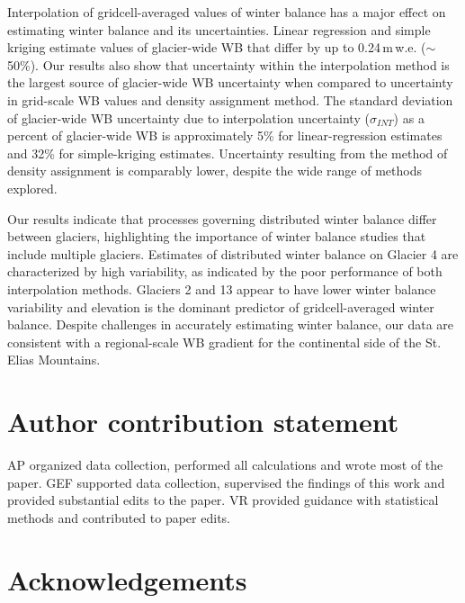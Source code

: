 \documentclass[twocolumn, letterpaper]{igs}
\begin{document}
Interpolation of gridcell-averaged values of winter balance has a major effect on estimating winter balance and its uncertainties. Linear regression and simple kriging estimate values of glacier-wide WB that differ by up to 0.24\,m\,w.e. ($\sim$50\%). Our results also show that uncertainty within the interpolation method is the largest source of glacier-wide WB uncertainty when compared to uncertainty in grid-scale WB values and density assignment method. The standard deviation of glacier-wide WB uncertainty due to interpolation uncertainty ($\sigma_{INT}$) as a percent of glacier-wide WB is approximately 5\% for linear-regression estimates and 32\% for simple-kriging estimates. Uncertainty resulting from the method of density assignment is comparably lower, despite the wide range of methods explored. 

Our results indicate that processes governing distributed winter balance differ between glaciers, highlighting the importance of winter balance studies that include multiple glaciers. Estimates of distributed winter balance on Glacier 4 are characterized by high variability, as indicated by the poor performance of both interpolation methods. Glaciers 2 and 13 appear to have lower winter balance variability and elevation is the dominant predictor of gridcell-averaged winter balance. Despite challenges in accurately estimating winter balance, our data are consistent with a regional-scale WB gradient for the continental side of the St. Elias Mountains. 

\section{Author contribution statement}

AP organized data collection, performed all calculations and wrote most of the paper. GEF supported data collection, supervised the findings of this work and provided substantial edits to the paper. VR provided guidance with statistical methods and contributed to paper edits.

\section{Acknowledgements}
\end{document}
